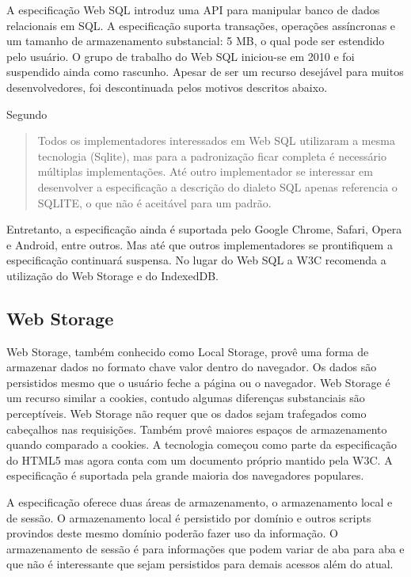 A especificação Web SQL introduz uma API para manipular banco de
dados relacionais em SQL. A especificação suporta transações,
operações assíncronas e um tamanho de armazenamento substancial: 5
MB, o qual pode ser estendido pelo usuário. O grupo de trabalho do Web
SQL iniciou-se em 2010 e foi suspendido ainda como rascunho. Apesar de
ser um recurso desejável para muitos desenvolvedores, foi descontinuada
pelos motivos descritos abaixo.

Segundo \citet{diveIntohtml}
\begin{quote}
Todos os implementadores interessados em Web SQL utilizaram a mesma
tecnologia (Sqlite), mas para a padronização ficar completa é
necessário múltiplas implementações. Até outro implementador se
interessar em desenvolver a especificação a descrição do dialeto SQL
apenas referencia o SQLITE, o que não é aceitável para um padrão.
\end{quote}

Entretanto, a especificação ainda é suportada pelo Google
Chrome, Safari, Opera e Android, entre outros. Mas até que outros
implementadores se prontifiquem a especificação continuará suspensa.
No lugar do Web SQL a W3C recomenda a utilização do Web Storage e do
IndexedDB.

\subsection{Web Storage}

Web Storage, também conhecido como Local Storage, provê uma forma
de armazenar dados no formato chave valor dentro do navegador. Os
dados são persistidos mesmo que o usuário feche a página ou o
navegador. Web Storage é um recurso similar a cookies, contudo algumas
diferenças substanciais são perceptíveis. Web Storage não requer que
os dados sejam trafegados como cabeçalhos nas requisições. Também
provê maiores espaços de armazenamento quando comparado a cookies. A
tecnologia começou como parte da especificação do HTML5 mas agora
conta com um documento próprio mantido pela W3C. A especificação é
suportada pela grande maioria dos navegadores populares.

A especificação oferece duas áreas de armazenamento, o armazenamento
local e de sessão. O armazenamento local é persistido por domínio
e outros scripts provindos deste mesmo domínio poderão fazer uso da
informação. O armazenamento de sessão é para informações que podem
variar de aba para aba e que não é interessante que sejam persistidos
para demais acessos além do atual.


